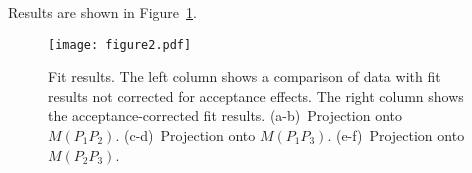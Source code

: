 \documentclass[10pt]{article}
\begin{document}
Results are shown in Figure~\ref{fig:results}.

\newpage
\begin{figure}[h!]
\begin{center}
\texttt{[image: figure2.pdf]}
\caption{Fit results.  The left column shows a comparison of data with fit results not corrected for acceptance effects.  The right column shows the acceptance-corrected fit results.  (a-b)~Projection onto $M(P_1P_2)$.  (c-d)~Projection onto $M(P_1P_3)$.  (e-f)~Projection onto $M(P_2P_3)$.
\label{fig:results}}
\end{center}
\end{figure}
\end{document}
